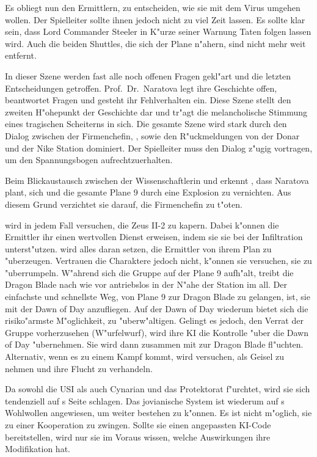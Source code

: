 Es obliegt nun den Ermittlern, zu entscheiden, wie sie mit dem Virus umgehen wollen. Der Spielleiter sollte ihnen jedoch nicht zu viel Zeit lassen. Es sollte klar sein, dass Lord Commander Steeler in K"urze seiner Warnung Taten folgen lassen wird. Auch die beiden Shuttles, die sich der Plane n"ahern, sind nicht mehr weit entfernt.

\vfill
\newpage

\begin{remarks}
	In dieser Szene werden fast alle noch offenen Fragen gekl"art und die letzten Entscheidungen getroffen. Prof.~Dr.~Naratova legt ihre Geschichte offen, beantwortet Fragen und gesteht ihr Fehlverhalten ein. Diese Szene stellt den zweiten H"ohepunkt der Geschichte dar und tr"agt die melancholische Stimmung eines tragischen Scheiterns in sich. Die gesamte Szene wird stark durch den Dialog zwischen der Firmenchefin, \xl{}, \ml{} sowie den R"uckmeldungen von der Donar und der Nike Station dominiert. Der Spielleiter muss den Dialog z"ugig vortragen, um den Spannungsbogen aufrechtzuerhalten.

	Beim Blickaustausch zwischen der Wissenschaftlerin und \xl{} erkennt \xl{}, dass Naratova plant, sich und die gesamte Plane 9 durch eine Explosion zu vernichten. Aus diesem Grund verzichtet sie darauf, die Firmenchefin zu t"oten.

	\xl{} wird in jedem Fall versuchen, die Zeus II-2 zu kapern. Dabei k"onnen die Ermittler ihr einen wertvollen Dienst erweisen, indem sie sie bei der Infiltration unterst"utzen. \xl{} wird alles daran setzen, die Ermittler von ihrem Plan zu "uberzeugen. Vertrauen die Charaktere \xl{} jedoch nicht, k"onnen sie versuchen, sie zu "uberrumpeln. W"ahrend sich die Gruppe auf der Plane 9 aufh"alt, treibt die Dragon Blade nach wie vor antriebslos in der N"ahe der Station im all. Der einfachste und schnellste Weg, von Plane 9 zur Dragon Blade zu gelangen, ist, sie mit der Dawn of Day anzufliegen. Auf der Dawn of Day wiederum bietet sich die risiko"armste M"oglichkeit, \xl{} zu "uberw"altigen. Gelingt es \xl{} jedoch, den Verrat der Gruppe vorherzusehen (W"urfelwurf), wird ihre KI die Kontrolle "uber die Dawn of Day "ubernehmen. Sie wird dann zusammen mit \ml{} zur Dragon Blade fl"uchten. Alternativ, wenn es zu einem Kampf kommt, wird \xl{} versuchen, \ml{} als Geisel zu nehmen und ihre Flucht zu verhandeln.

	Da \ml{} sowohl die USI als auch Cynarian und das Protektorat f"urchtet, wird sie sich tendenziell auf \xl{}s Seite schlagen. Das jovianische System ist wiederum auf \ml{}s Wohlwollen angewiesen, um weiter bestehen zu k"onnen. Es ist nicht m"oglich, sie zu einer Kooperation zu zwingen. Sollte sie einen angepassten KI-Code bereitstellen, wird nur sie im Voraus wissen, welche Auswirkungen ihre Modifikation hat.


\end{remarks}
